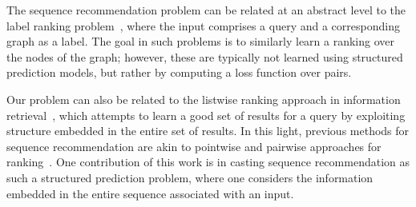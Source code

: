 
The sequence recommendation problem can be related at an abstract level to the label ranking problem~\citep{Dekel:2003},
where the input comprises a query and a corresponding graph as a label.
The goal in such problems is to similarly learn a ranking over the nodes of the graph;
however, these are typically not learned using structured prediction models,
but rather by computing a loss function over pairs.

Our problem can also be related to the listwise ranking approach in information retrieval~\citep{Cao:2007},
which attempts to learn a good set of results for a query by exploiting structure embedded in the entire set of results.
In this light, previous methods for sequence recommendation are akin to pointwise and pairwise approaches for ranking~\citep{Liu:2009}.
One contribution of this work is in casting sequence recommendation as such a structured prediction problem, where one considers the information embedded in the entire sequence associated with an input.
